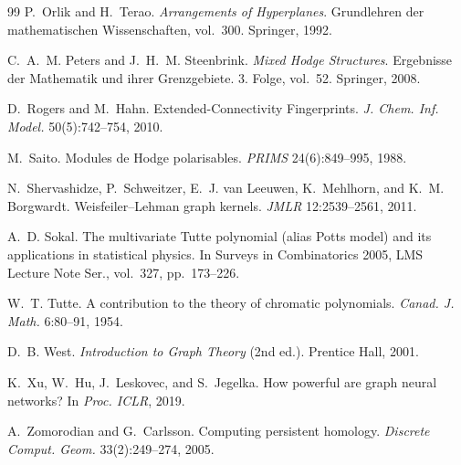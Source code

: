 \documentclass[runningheads]{llncs}
\begin{document}
\begin{thebibliography}{99}
P.~Orlik and H.~Terao.
\newblock \emph{Arrangements of Hyperplanes}.
\newblock Grundlehren der mathematischen Wissenschaften, vol.~300. Springer, 1992.

C.~A.~M. Peters and J.~H.~M. Steenbrink.
\newblock \emph{Mixed Hodge Structures}.
\newblock Ergebnisse der Mathematik und ihrer Grenzgebiete. 3. Folge, vol.~52. Springer, 2008.

D.~Rogers and M.~Hahn.
\newblock Extended-Connectivity Fingerprints.
\newblock \emph{J. Chem. Inf. Model.} 50(5):742--754, 2010.

M.~Saito.
\newblock Modules de Hodge polarisables.
\newblock \emph{PRIMS} 24(6):849--995, 1988.

N.~Shervashidze, P.~Schweitzer, E.~J. van Leeuwen, K.~Mehlhorn, and K.~M. Borgwardt.
\newblock Weisfeiler--Lehman graph kernels.
\newblock \emph{JMLR} 12:2539--2561, 2011.

A.~D. Sokal.
\newblock The multivariate Tutte polynomial (alias Potts model) and its applications in statistical physics.
\newblock In Surveys in Combinatorics 2005, LMS Lecture Note Ser., vol.~327, pp.~173--226. 

W.~T. Tutte.
\newblock A contribution to the theory of chromatic polynomials.
\newblock \emph{Canad. J. Math.} 6:80--91, 1954.

D.~B. West.
\newblock \emph{Introduction to Graph Theory} (2nd ed.).
\newblock Prentice Hall, 2001.

K.~Xu, W.~Hu, J.~Leskovec, and S.~Jegelka.
\newblock How powerful are graph neural networks?
\newblock In \emph{Proc. ICLR}, 2019.

A.~Zomorodian and G.~Carlsson.
\newblock Computing persistent homology.
\newblock \emph{Discrete Comput. Geom.} 33(2):249--274, 2005.

\end{thebibliography}
\end{document}
